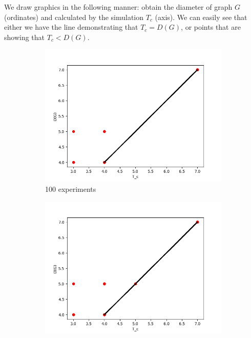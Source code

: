 \documentclass{llncs}
\begin{document}
We draw graphics in the following manner: obtain the diameter of graph $G$ (ordinates) and calculated by the simulation $T_c$ (axis). We can easily see that either we have the line demonstrating that $T_c = D(G)$, or
points that are showing that $T_c < D(G)$.
%
\begin{figure}[p]\label{pic:diagram}
\begin{subfigure}{0.3\linewidth}
\centering\includegraphics[width=\linewidth]{images/100-consistency-convergence.png}
\caption{100 experiments}\label{100}
\end{subfigure}
\begin{subfigure}{0.3\linewidth}
\centering\includegraphics[width=\linewidth]{images/200-consistency-convergence.png}

\end{subfigure}
\end{figure}
\end{document}
